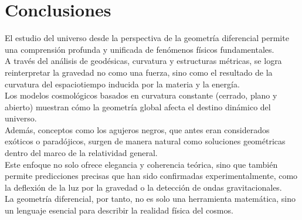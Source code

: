 \documentclass{aleph-revista}
\begin{document}
\section{Conclusiones}
El estudio del universo desde la perspectiva de la geometría diferencial permite una comprensión profunda y unificada de fenómenos físicos fundamentales.\\
A través del análisis de geodésicas, curvatura y estructuras métricas, se logra reinterpretar la gravedad no como una fuerza, sino como el resultado de la curvatura del espaciotiempo inducida por la materia y la energía.\\
Los modelos cosmológicos basados en curvatura constante (cerrado, plano y abierto) muestran cómo la geometría global afecta el destino dinámico del universo.\\
Además, conceptos como los agujeros negros, que antes eran considerados exóticos o paradójicos, surgen de manera natural como soluciones geométricas dentro del marco de la relatividad general.\\
Este enfoque no solo ofrece elegancia y coherencia teórica, sino que también permite predicciones precisas que han sido confirmadas experimentalmente, como la deflexión de la luz por la gravedad o la detección de ondas gravitacionales.\\
La geometría diferencial, por tanto, no es solo una herramienta matemática, sino un lenguaje esencial para describir la realidad física del cosmos.
\newpage
\nocite{*}
\printbibliography
\end{document}
